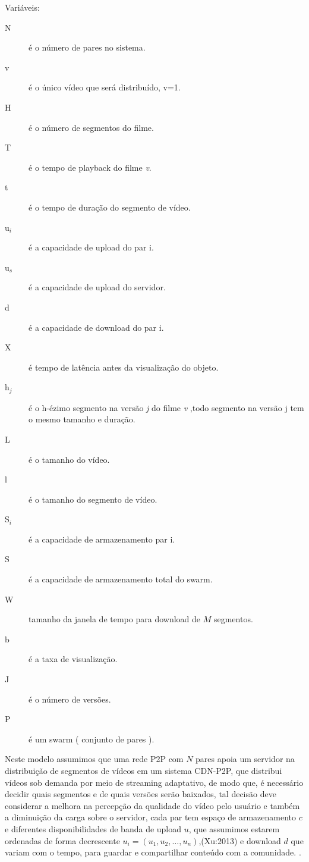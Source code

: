 \documentclass[
	12pt,				%
	oneside,			%
	a4paper,			%
	english,			%
	brazil				%
	]{abntex2ppgsi}
\begin{document}
 	 	Variáveis:
\begin{description}
\item[N] 	é o número de pares no sistema.
\item[v] 	é o único vídeo que será distribuído, v=1.
\item[H] 	é o número de segmentos do filme. 
\item[T] 	é o tempo de playback do filme \textit{v}.
\item[t] 	é o tempo de duração do segmento de vídeo.
\item[u$_i$] é a capacidade de upload do par i.
\item[u$_s$] é a capacidade de upload do servidor.
\item[d] 	é a capacidade de download do par i.
\item[X] 	é tempo de latência antes da visualização do objeto.
\item[h$_j$] 	é o h-ézimo segmento na versão \textit{j} do filme \textit{v}  ,todo segmento na versão j tem o mesmo tamanho e duração.
\item[L] 	é o tamanho do vídeo.
\item[l] 	é o tamanho do segmento de vídeo.
\item[S$_i$] 	é a capacidade de armazenamento par i.
\item[S] 	é a capacidade de armazenamento total do swarm.
\item[W] 	tamanho da janela de tempo para download de $M$ segmentos.
\item[b]  	é a taxa de visualização.
\item[J]  	é o número de versões.
\item[P]  	é um swarm ( conjunto de pares ).

\end{description}
\newcommand{\vetu}{$u_i=(u_1,u_2,\ldots,u_n)$}
Neste modelo assumimos que uma rede P2P com $N$ pares apoia um servidor na distribuição de segmentos de vídeos em um sistema CDN-P2P, que distribui vídeos sob demanda por meio de streaming adaptativo, de modo que, é necessário decidir quais segmentos e de quais versões serão baixados, tal decisão deve considerar a melhora na percepção da qualidade do vídeo pelo usuário e também a diminuição da carga sobre o servidor, cada par tem espaço de armazenamento $c$ e diferentes disponibilidades de banda de upload $u$, que assumimos estarem ordenadas de forma decrescente \vetu,(Xu:2013) e download $d$ que variam com o tempo, para guardar e compartilhar conteúdo com a comunidade.
.
\newcommand{\vetr}{$rj=(r_1,r_2,\ldots,r_J)$}
\end{document}
